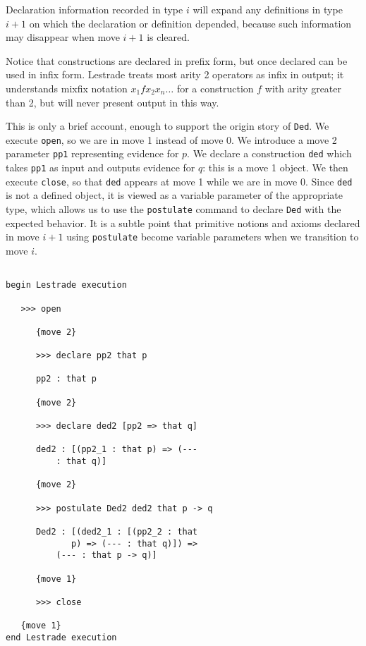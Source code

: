 \documentclass[12pt]{article}
\begin{document}
Declaration information recorded in type $i$ will expand any definitions in type $i+1$ on which the declaration or definition depended, because such information may disappear
when move $i+1$ is cleared.

Notice that constructions are declared in prefix form, but once declared can be used in infix form.  Lestrade treats most arity 2 operators as infix in output;  it understands mixfix notation $x_1 f x_2 x_n\ldots$ for a construction $f$ with arity greater than 2, but will never present output in this way.

This is only a brief account, enough to support the origin story of {\tt Ded}.  We execute {\tt open}, so we are in move 1 instead of move 0.  We introduce a move 2
parameter {\tt pp1} representing evidence for $p$.  We declare a construction {\tt ded} which takes {\tt pp1} as input and outputs evidence for $q$:  this is a move 1 object.
We then execute {\tt close}, so that {\tt ded} appears at move 1 while we are in move 0.  Since {\tt ded} is not a defined object, it is viewed as a variable parameter of the appropriate type,
which allows us to use the {\tt postulate} command to declare {\tt Ded} with the expected behavior.  It is a subtle point that primitive notions and axioms declared in move $i+1$ using
{\tt postulate} become variable parameters when we transition to move $i$.

\begin{verbatim}

begin Lestrade execution

   >>> open

      {move 2}

      >>> declare pp2 that p

      pp2 : that p

      {move 2}

      >>> declare ded2 [pp2 => that q]

      ded2 : [(pp2_1 : that p) => (--- 
          : that q)]

      {move 2}

      >>> postulate Ded2 ded2 that p -> q

      Ded2 : [(ded2_1 : [(pp2_2 : that 
             p) => (--- : that q)]) => 
          (--- : that p -> q)]

      {move 1}

      >>> close

   {move 1}
end Lestrade execution
\end{verbatim}
\end{document}
